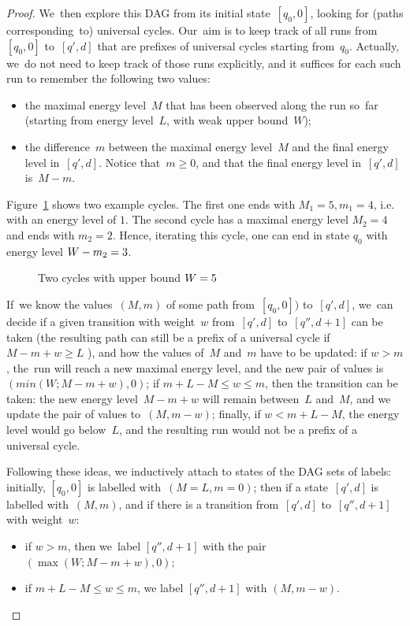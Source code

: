 \begin{proof}
    We~then explore this DAG from its initial state~$[q_0,0]$,
    looking for (paths corresponding~to) universal cycles. Our~aim is to keep track of all runs from~$[q_0,0]$ to~$[q',d]$ that are prefixes of universal cycles starting from~$q_0$. Actually, we~do not need to keep track of those runs explicitly, and it suffices for each such run to remember the following two values:
    \begin{itemize}
    \item the maximal energy level~$M$ that has been observed along the run so~far (starting from energy level~$L$, with weak upper bound~$W$);
    \item the difference~$m$ between the maximal energy level~$M$ and the final energy level in~$[q',d]$. Notice that~$m\geq 0$, and that the final energy level in~$[q',d]$ is~$M-m$. 
    \end{itemize}
    
    Figure~\ref{fig-ex_cycles} shows two example cycles. The first one ends with $M_1=5, m_1=4$, i.e. with an energy level of $1$. The second cycle has a maximal energy level $M_2=4$ and ends with $m_2=2$. Hence, iterating this cycle, one can end in state $q_0$ with energy level $W-m_2=3$.
    
    \begin{figure}[htbp]
        \centering
        \scalebox{1}{
        
        }
        \caption{Two cycles with upper bound $W=5$}
        \label{fig-ex_cycles}
    \end{figure}
    
    
    
    If~we know the values~$(M,m)$ of some path from~$[q_0,0])$ to~$[q',d]$, we~can decide if a given transition with weight~$w$ from~$[q',d]$ to~$[q'',d+1]$ can be taken 
    (the resulting path can still be a prefix of a universal cycle if $M-m+w \geq L$ ), and how the values of~$M$ and~$m$ have
    to be updated: if $w>m$, the~run will reach a new maximal energy level, and the new pair of values is $(min(W;M-m+w),0)$; if $m+L-M\leq w\leq m$, then the transition can be taken: the new energy level~$M-m+w$ will remain between~$L$ and~$M$, and we update the pair of values to~$(M,m-w)$; finally, if $w<m+L-M$, the energy level would go below~$L$, and the resulting run would not be a prefix of a universal cycle.
    
    
    Following these ideas, we inductively attach to states of the DAG sets of labels:
    initially, $[q_0,0]$ is labelled with~$(M=L,m=0)$; then if a
    state~$[q',d]$ is labelled with~$(M,m)$, and if there is a transition from~$[q',d]$ to~$[q'',d+1]$ with weight~$w$:
    \begin{itemize}
    \item if $w>m$, then we~label $[q'',d+1]$ with the pair $(\max(W;M-m+w),0)$;
    \item if $m+L-M\leq w\leq m$, we label $[q'',d+1]$ with $(M,m-w)$.
    \end{itemize}
    

\end{proof}
